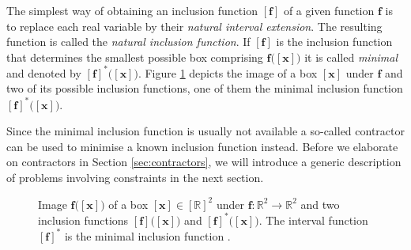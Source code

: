 \noindent
The simplest way of obtaining an inclusion function $[\bm{f}]$ of a given function $\bm{f}$ is to replace each real variable by their \emph{natural interval extension}. The resulting function is called the \emph{natural inclusion function}. If $[\bm{f}]$ is the inclusion function that determines the smallest possible box comprising $\bm{f}\big([\bm{x}]\big)$ it is called \emph{minimal} and denoted by $[\bm{f}]^{\ast} \big([\bm{x}]\big)$. Figure \ref{fig:inclusion_functions} depicts the image of a box $[\bm{x}]$ under $\bm{f}$ and two of its possible inclusion functions, one of them the minimal inclusion function $[\bm{f}]^{*}\big([\bm{x}]\big)$.

Since the minimal inclusion function is usually not available a so-called contractor can be used to minimise a known inclusion function instead. Before we elaborate on contractors in Section \ref{sec:contractors}, we will introduce a generic description of problems involving constraints in the next section.


\begin{figure}[t]
\centering
{}
\caption[Image of an interval box and two inclusion functions.]{Image $\bm{f}\big([\bm{x}]\big)$ of a box $[\bm{x}] \in [\mathbb{R}]^2$ under $\bm{f}: \mathbb{R}^2 \rightarrow \mathbb{R}^2$ and two inclusion functions $[\bm{f}]\big([\bm{x}]\big)$ and $[\bm{f}]^{*}\big([\bm{x}]\big)$. The interval function $[\bm{f}]^{*}$ is the minimal inclusion function \cite{jaulin2001applied}.}
	\label{fig:inclusion_functions}
\end{figure}


